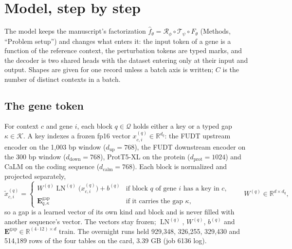 
\section{Model, step by step}
\label{sec:model}

The model keeps the manuscript's factorization $\hat f_\theta = \mathcal{R}_\phi \circ
\mathcal{T}_\psi \circ F_\theta$ (Methods, ``Problem setup'') and changes what enters it:
the input token of a gene is a function of the reference context, the perturbation tokens
are typed marks, and the decoder is two shared heads with the dataset entering only at
their input and output. Shapes are given for one record unless a batch axis is written;
$C$ is the number of distinct contexts in a batch.

\subsection{The gene token}
\label{sec:token}

For context $c$ and gene $i$, each block $q \in \mathcal{Q}$ holds either a key or a typed
gap $\kappa \in \mathcal{K}$. A key indexes a frozen fp16 vector $x^{(q)}_{c,i} \in
\mathbb{R}^{d_q}$: the FUDT upstream encoder on the 1{,}003 bp window ($d_{\mathrm{up}} =
768$), the FUDT downstream encoder on the 300 bp window ($d_{\mathrm{down}} = 768$),
ProtT5-XL on the protein ($d_{\mathrm{prot}} = 1024$) and CaLM on the coding sequence
($d_{\mathrm{calm}} = 768$). Each block is normalized and projected separately,
\begin{equation}
\tilde x^{(q)}_{c,i} =
\begin{cases}
W^{(q)} \operatorname{LN}^{(q)}\!\big(x^{(q)}_{c,i}\big) + b^{(q)} & \text{if block } q \text{ of gene } i \text{ has a key in } c,\\[2pt]
\mathbf{E}^{\mathrm{gap}}_{q,\kappa} & \text{if it carries the gap } \kappa,
\end{cases}
\qquad W^{(q)} \in \mathbb{R}^{d \times d_q},
\label{eq:block}
\end{equation}
so a gap is a learned vector of its own kind and block and is never filled with another
sequence's vector. The vectors stay frozen; $\operatorname{LN}^{(q)}$, $W^{(q)}$, $b^{(q)}$
and $\mathbf{E}^{\mathrm{gap}} \in \mathbb{R}^{(4 \cdot 12) \times d}$ train. The overnight
runs held 929{,}348, 326{,}255, 329{,}430 and 514{,}189 rows of the four tables on the card,
3.39 GB (job 6136 log).

